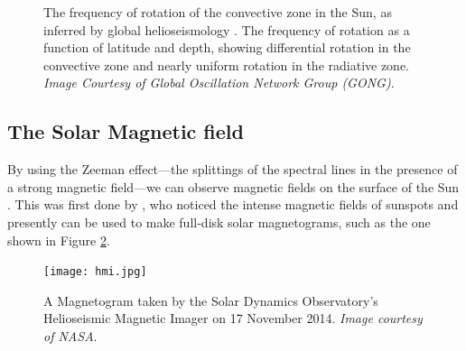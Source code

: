 \documentclass[11pt,a4paper,onecolumn]{report}
\begin{document}
\begin{figure}[t]%
  \centering
  \qquad
  \caption[]{ The frequency of rotation of the
    convective zone in the Sun, as inferred by global helioseismology
    \citep{thompson_helioseismology_2004}.  The
    frequency of rotation as a function of latitude and depth, showing differential
    rotation in the convective zone and nearly uniform rotation in the radiative
    zone. \textit{Image Courtesy of Global Oscillation Network Group
    (GONG)\footnotemark }.}
  \label{fig:solar_rotation}
\end{figure}



\subsection{The Solar Magnetic field}
%
\label{sec:dynamo}

By using the Zeeman effect---the splittings of the spectral lines in the presence of
a strong magnetic field---we can observe magnetic fields on the surface of
the Sun \citep{zeeman_over_1896}. This was first done by \citet{hale_probable_1908}, who noticed the
intense magnetic fields of sunspots and presently can be used to make full-disk
solar magnetograms, such as the one shown in Figure \ref{fig:hmi}.
\\
\begin{figure}[t]
  \centering
  \texttt{[image: hmi.jpg]}
  \caption{A Magnetogram taken by the Solar Dynamics Observatory's Helioseismic
  Magnetic Imager on 17 November 2014. \textit{Image courtesy of NASA}.}
  \label{fig:hmi}
\end{figure}
\end{document}
